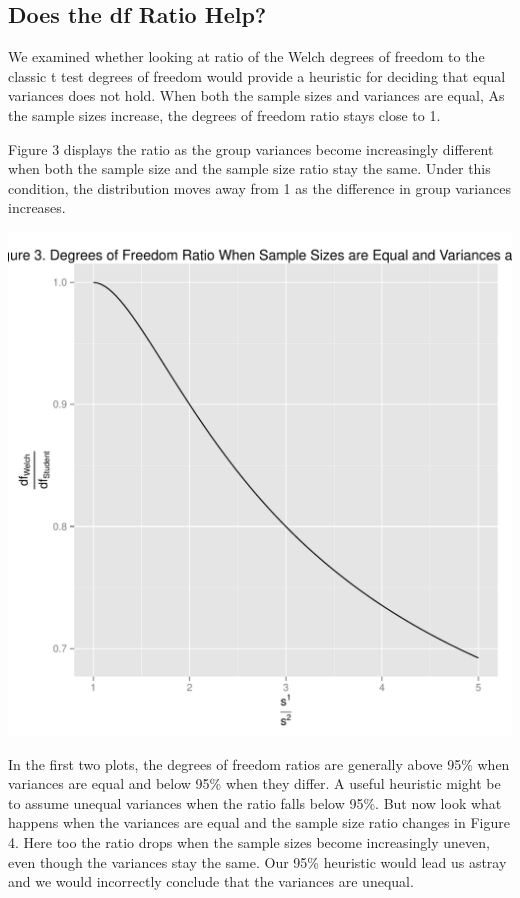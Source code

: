 \documentclass[man,a4paper,noextraspace]{apa6}\usepackage[]{graphicx}\usepackage[]{color}
\makeatletter
\def\maxwidth{ %
  \ifdim\Gin@nat@width>\linewidth
    \linewidth
  \else
    \Gin@nat@width
  \fi
}
\newenvironment{knitrout}{}{} %
\makeatother
\begin{document}
\subsection{Does the df Ratio Help?}
    We examined whether looking at ratio of the Welch degrees of freedom to the classic t test degrees of freedom would provide a heuristic for deciding that equal variances does not hold. When both the sample sizes and variances are equal,  As the sample sizes increase, the degrees of freedom ratio stays close to 1. 

    Figure 3 displays the ratio as the group variances become increasingly different when both the sample size and the sample size ratio stay the same. Under this condition, the distribution moves away from 1 as the difference in group variances increases.

\begin{knitrout}
\color{fgcolor}
\includegraphics[width=\maxwidth]{figure/dfratiosDiffvars} 

\end{knitrout}

    In the first two plots, the degrees of freedom ratios are generally above 95\% when variances are equal and below 95\% when they differ. A useful heuristic might be to assume unequal variances when the ratio falls below 95\%. But now look what happens when the variances are equal and the sample size ratio changes in Figure 4. Here too the ratio drops when the sample sizes become increasingly uneven, even though the variances stay the same. Our 95\% heuristic would lead us astray and we would incorrectly conclude that the variances are unequal.
\end{document}
